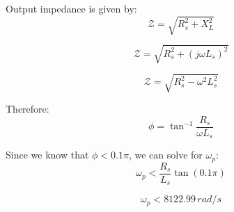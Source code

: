 \documentclass{article}
\begin{document}
Output impedance is given by:
\begin{equation*}
    \mathcal{Z} = \sqrt{R_s^2  + X_L^2}
\end{equation*}

\begin{equation*}
    \mathcal{Z} = \sqrt{R_s^2  + (j\omega L_s)^2}
\end{equation*}

\begin{equation*}
    \mathcal{Z} = \sqrt{R_s^2  - \omega^2 L_s^2}
\end{equation*}

Therefore:
\begin{equation*}
    \phi = \tan^{-1}\frac{R_s}{\omega L_s}
\end{equation*}

Since we know that $\phi < 0.1\pi$, we can solve for $\omega_p$:
\begin{equation*}
    \omega_p < \frac{R_s}{L_s} \tan(0.1\pi)
\end{equation*}

\begin{equation*}
    \omega_p < 8122.99\, rad/s
\end{equation*}
\end{document}
